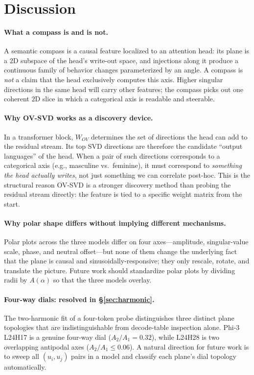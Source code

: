 \section{Discussion}
\label{sec:discussion}

\paragraph{What a compass is and is not.} A semantic compass is a causal
feature localized to an attention head: its plane is a $2$D subspace of
the head's write-out space, and injections along it produce a continuous
family of behavior changes parameterized by an angle. A compass is
\emph{not} a claim that the head exclusively computes this axis. Higher
singular directions in the same head will carry other features; the
compass picks out one coherent $2$D slice in which a categorical axis is
readable and steerable.

\paragraph{Why OV-SVD works as a discovery device.} In a transformer
block, $W_{OV}$ determines the set of directions the head can add to the
residual stream. Its top SVD directions are therefore the candidate
``output languages'' of the head. When a pair of such directions
corresponds to a categorical axis (e.g., masculine vs.\ feminine), it
must correspond to \emph{something the head actually writes}, not just
something we can correlate post-hoc. This is the structural reason
OV-SVD is a stronger discovery method than probing the residual stream
directly: the feature is tied to a specific weight matrix from the
start.

\paragraph{Why polar shape differs without implying different
mechanisms.} Polar plots across the three models differ on four
axes---amplitude, singular-value scale, phase, and neutral offset---but
none of them change the underlying fact that the plane is causal and
sinusoidally-responsive; they only rescale, rotate, and translate the
picture. Future work should standardize polar plots by
dividing radii by $A(\alpha)$ so that the three models overlay.

\paragraph{Four-way dials: resolved in \S\ref{sec:harmonic}.} The two-harmonic
fit of a four-token probe distinguishes three distinct plane topologies
that are indistinguishable from decode-table inspection alone. Phi-3
L24H17 is a genuine four-way dial ($A_2 / A_1 = 0.32$), while L24H28
is two overlapping antipodal axes ($A_2 / A_1 \leq 0.06$). A natural
direction for future work is to sweep all $(u_i, u_j)$ pairs in a
model and classify each plane's dial topology automatically.

